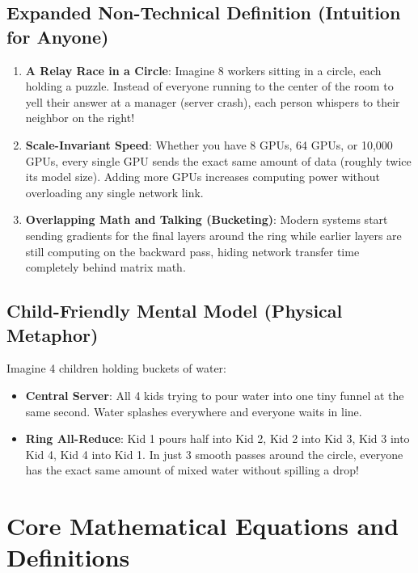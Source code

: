 \documentclass[11pt,a4paper]{article}
\theoremstyle{definition}
\begin{document}
\subsection{Expanded Non-Technical Definition (Intuition for Anyone)}
\begin{enumerate}
    \item \textbf{A Relay Race in a Circle}: Imagine 8 workers sitting in a circle, each holding a puzzle. Instead of everyone running to the center of the room to yell their answer at a manager (server crash), each person whispers to their neighbor on the right!
    \item \textbf{Scale-Invariant Speed}: Whether you have 8 GPUs, 64 GPUs, or 10,000 GPUs, every single GPU sends the exact same amount of data (roughly twice its model size). Adding more GPUs increases computing power without overloading any single network link.
    \item \textbf{Overlapping Math and Talking (Bucketing)}: Modern systems start sending gradients for the final layers around the ring while earlier layers are still computing on the backward pass, hiding network transfer time completely behind matrix math.
\end{enumerate}

\subsection{Child-Friendly Mental Model (Physical Metaphor)}
Imagine 4 children holding buckets of water:
\begin{itemize}
    \item \textbf{Central Server}: All 4 kids trying to pour water into one tiny funnel at the same second. Water splashes everywhere and everyone waits in line.
    \item \textbf{Ring All-Reduce}: Kid 1 pours half into Kid 2, Kid 2 into Kid 3, Kid 3 into Kid 4, Kid 4 into Kid 1. In just 3 smooth passes around the circle, everyone has the exact same amount of mixed water without spilling a drop!
\end{itemize}

\section{Core Mathematical Equations and Definitions}
\end{document}
